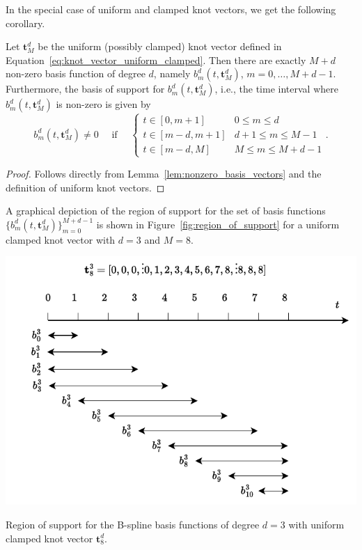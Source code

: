 In the special case of uniform and clamped knot vectors, we get the following corollary.

\begin{corollary}\label{lem:nonzero_basis_vectors}
	Let $\mathbf{t}_M^d$ be the uniform (possibly clamped) knot vector defined in Equation~\eqref{eq:knot_vector_uniform_clamped}.
	Then there are exactly $M+d$ non-zero basis function of degree $d$, namely $b_m^d(t, \mathbf{t}_M^d)$, $m=0, \dots, M+d-1$.
	Furthermore, the basis of support for $b_m^d(t, \mathbf{t}_M^d)$, i.e., the time interval where $b_m^d(t, \mathbf{t}_M^d)$ is non-zero is given by
		\[
				b_m^d(t, \mathbf{t}_M^d) \neq 0 
				\quad \text{~if~} \quad
				\begin{cases}
				t \in [0, m+1] & 0\leq m \leq d \\
				t \in [m-d, m+1] & d+1 \leq m \leq M-1 \\
				t \in [m-d, M] & M \leq m \leq M+d-1
				\end{cases}.
		\]	
\end{corollary} 
\begin{proof}  Follows directly from Lemma~\ref{lem:nonzero_basis_vectors} and the definition of uniform knot vectors.
\end{proof}

A graphical depiction of the region of support for the set of basis functions $\{b_m^d(t, \mathbf{t}_M^d)\}_{m=0}^{M+d-1}$ is shown in Figure~\ref{fig:region_of_support} for a uniform clamped knot vector with $d=3$ and $M=8$.
\begin{marginfigure}[0in]
  \includegraphics[width=\linewidth]{./chap5_trajectory_planning/figures/region_of_support.drawio.pdf}
  \caption{Region of support for the B-spline basis functions of degree $d=3$ with uniform clamped knot vector $\mathbf{t}_8^d$.}
  \label{fig:region_of_support}  
\end{marginfigure}

